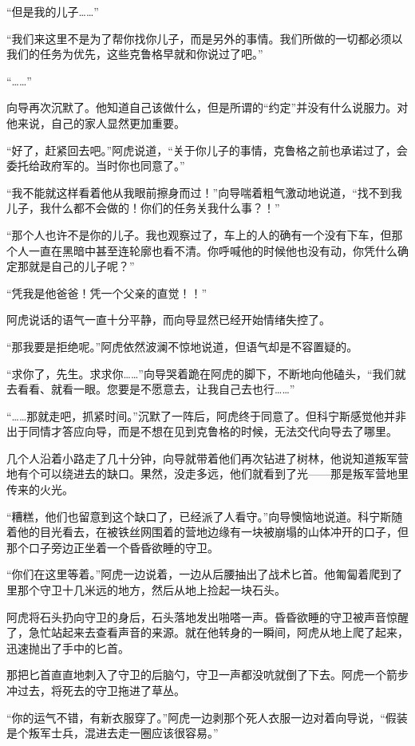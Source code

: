 “但是我的儿子……”

“我们来这里不是为了帮你找你儿子，而是另外的事情。我们所做的一切都必须以我们的任务为优先，这些克鲁格早就和你说过了吧。”

“……”

向导再次沉默了。他知道自己该做什么，但是所谓的“约定”并没有什么说服力。对他来说，自己的家人显然更加重要。

“好了，赶紧回去吧。”阿虎说道，“关于你儿子的事情，克鲁格之前也承诺过了，会委托给政府军的。当时你也同意了。”

“我不能就这样看着他从我眼前擦身而过！”向导喘着粗气激动地说道，“找不到我儿子，我什么都不会做的！你们的任务关我什么事？！”

“那个人也许不是你的儿子。我也观察过了，车上的人的确有一个没有下车，但那个人一直在黑暗中甚至连轮廓也看不清。你呼喊他的时候他也没有动，你凭什么确定那就是自己的儿子呢？”

“凭我是他爸爸！凭一个父亲的直觉！！”

阿虎说话的语气一直十分平静，而向导显然已经开始情绪失控了。

“那我要是拒绝呢。”阿虎依然波澜不惊地说道，但语气却是不容置疑的。

“求你了，先生。求求你……”向导哭着跪在阿虎的脚下，不断地向他磕头，“我们就去看看、就看一眼。您要是不愿意去，让我自己去也行……”

“……那就走吧，抓紧时间。”沉默了一阵后，阿虎终于同意了。但科宁斯感觉他并非出于同情才答应向导，而是不想在见到克鲁格的时候，无法交代向导去了哪里。

几个人沿着小路走了几十分钟，向导就带着他们再次钻进了树林，他说知道叛军营地有个可以绕进去的缺口。果然，没走多远，他们就看到了光——那是叛军营地里传来的火光。

“糟糕，他们也留意到这个缺口了，已经派了人看守。”向导懊恼地说道。科宁斯随着他的目光看去，在被铁丝网围着的营地边缘有一块被崩塌的山体冲开的口子，但那个口子旁边正坐着一个昏昏欲睡的守卫。

“你们在这里等着。”阿虎一边说着，一边从后腰抽出了战术匕首。他匍匐着爬到了里那个守卫十几米远的地方，然后从地上捡起一块石头。

阿虎将石头扔向守卫的身后，石头落地发出啪嗒一声。昏昏欲睡的守卫被声音惊醒了，急忙站起来去查看声音的来源。就在他转身的一瞬间，阿虎从地上爬了起来，迅速抛出了手中的匕首。

那把匕首直直地刺入了守卫的后脑勺，守卫一声都没吭就倒了下去。阿虎一个箭步冲过去，将死去的守卫拖进了草丛。

“你的运气不错，有新衣服穿了。”阿虎一边剥那个死人衣服一边对着向导说，“假装是个叛军士兵，混进去走一圈应该很容易。”

